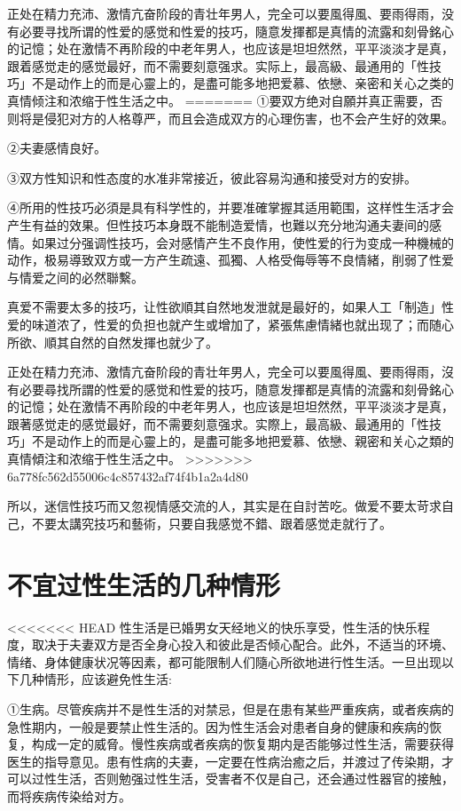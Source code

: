 \documentclass[12pt,UTF8]{ctexbook}
\begin{document}
正处在精力充沛、激情亢奋阶段的青壮年男人，完全可以要風得風、要雨得雨，没有必要寻找所谓的性爱的感觉和性爱的技巧，隨意发揮都是真情的流露和刻骨銘心的记憶；处在激情不再阶段的中老年男人，也应该是坦坦然然，平平淡淡才是真，跟着感觉走的感觉最好，而不需要刻意强求。实际上，最高級、最通用的「性技巧」不是动作上的而是心靈上的，是盡可能多地把爱慕、依戀、亲密和关心之类的真情倾注和浓缩于性生活之中。
=======
①要双方绝对自願并真正需要，否则将是侵犯对方的人格尊严，而且会造成双方的心理伤害，也不会产生好的效果。

②夫妻感情良好。

③双方性知识和性态度的水准非常接近，彼此容易沟通和接受对方的安排。

④所用的性技巧必須是具有科学性的，并要准確掌握其适用範围，这样性生活才会产生有益的效果。但性技巧本身既不能制造爱情，也難以充分地沟通夫妻间的感情。如果过分强调性技巧，会对感情产生不良作用，使性爱的行为变成一种機械的动作，极易導致双方或一方产生疏遠、孤獨、人格受侮辱等不良情緒，削弱了性爱与情爱之间的必然聯繫。

真爱不需要太多的技巧，让性欲順其自然地发泄就是最好的，如果人工「制造」性爱的味道浓了，性爱的负担也就产生或增加了，紧張焦慮情緒也就出现了；而随心所欲、順其自然的自然发揮也就少了。

正处在精力充沛、激情亢奋阶段的青壮年男人，完全可以要風得風、要雨得雨，沒有必要尋找所謂的性爱的感觉和性爱的技巧，随意发揮都是真情的流露和刻骨銘心的记憶；处在激情不再阶段的中老年男人，也应该是坦坦然然，平平淡淡才是真，跟著感觉走的感觉最好，而不需要刻意强求。实際上，最高級、最通用的「性技巧」不是动作上的而是心靈上的，是盡可能多地把爱慕、依戀、親密和关心之類的真情傾注和浓缩于性生活之中。
>>>>>>> 6a778fc562d55006c4c857432af74f4b1a2a4d80

所以，迷信性技巧而又忽视情感交流的人，其实是在自討苦吃。做爱不要太苛求自己，不要太講究技巧和藝術，只要自我感觉不錯、跟着感觉走就行了。

\section{不宜过性生活的几种情形}

<<<<<<< HEAD
性生活是已婚男女天经地义的快乐享受，性生活的快乐程度，取决于夫妻双方是否全身心投入和彼此是否倾心配合。此外，不适当的环境、情绪、身体健康状况等因素，都可能限制人们隨心所欲地进行性生活。一旦出现以下几种情形，应该避免性生活:

①生病。尽管疾病并不是性生活的对禁忌，但是在患有某些严重疾病，或者疾病的急性期内，一般是要禁止性生活的。因为性生活会对患者自身的健康和疾病的恢复，构成一定的威脅。慢性疾病或者疾病的恢复期内是否能够过性生活，需要获得医生的指导意见。患有性病的夫妻，一定要在性病治癒之后，并渡过了传染期，才可以过性生活，否则勉强过性生活，受害者不仅是自己，还会通过性器官的接触，而将疾病传染给对方。
\end{document}
